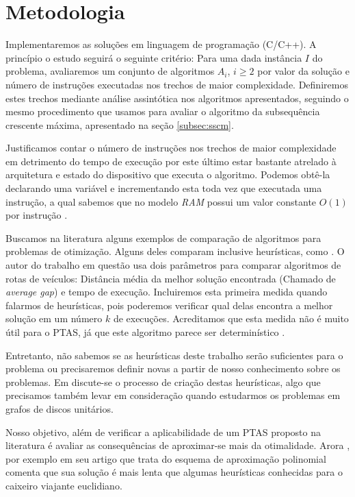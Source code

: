 \section{Metodologia}

Implementaremos as soluções em linguagem de programação (C/C++). A princípio o estudo seguirá o seguinte critério: Para uma dada instância $I$ do problema, avaliaremos um conjunto de algoritmos $A_i$, $i \geq 2$ por valor da solução e número de instruções executadas nos trechos de maior complexidade. Definiremos estes trechos mediante análise assintótica nos algoritmos apresentados, seguindo o mesmo procedimento que usamos para avaliar o algoritmo da subsequência crescente máxima, apresentado na seção \ref{subsec:sscm}.

Justificamos contar o número de instruções nos trechos de maior complexidade em detrimento do tempo de execução por este último estar bastante atrelado à arquitetura e estado do dispositivo que executa o algoritmo. Podemos obtê-la declarando uma variável e incrementando esta toda vez que executada uma instrução, a qual sabemos que no modelo \textit{RAM} possui um valor constante $O(1)$ por instrução \cite{arora1998polynomial}.

Buscamos na literatura alguns exemplos de comparação de algoritmos para problemas de otimização. Alguns deles comparam inclusive heurísticas, como \cite{ropke2005heuristic}. O autor do trabalho em questão usa dois parâmetros para comparar algoritmos de rotas de veículos: Distância média da melhor solução encontrada (Chamado de \textit{average gap}) e tempo de execução. Incluiremos esta primeira medida quando falarmos de heurísticas, pois poderemos verificar qual delas encontra a melhor solução em um número $k$ de execuções. Acreditamos que esta medida não é muito útil para o PTAS, já que este algoritmo parece ser determinístico \cite{li}.

Entretanto, não sabemos se as heurísticas deste trabalho serão suficientes para o problema ou precisaremos definir novas a partir de nosso conhecimento sobre os problemas. Em \cite{lenat} discute-se o processo de criação destas heurísticas, algo que precisamos também levar em consideração quando estudarmos os problemas em grafos de discos unitários.

Nosso objetivo, além de verificar a aplicabilidade de um PTAS proposto na literatura é avaliar as consequências de aproximar-se mais da otimalidade. Arora \cite{arora1998polynomial}, por exemplo em seu artigo que trata do esquema de aproximação polinomial comenta que sua solução é mais lenta que algumas heurísticas conhecidas para o caixeiro viajante euclidiano. 

